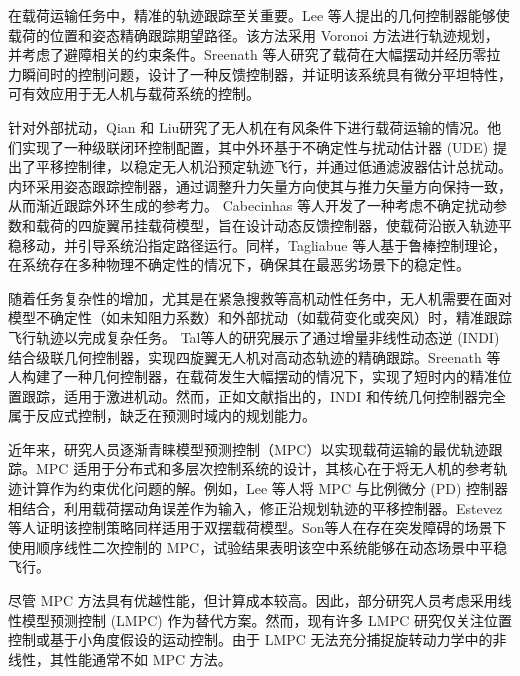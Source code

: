 \documentclass[lang=chs, degree=master, blindreview=false, winfonts=true]{yanputhesis}
\begin{document}
在载荷运输任务中，精准的轨迹跟踪至关重要。Lee 等人\cite{lee2015collision,lee2017geometric}提出的几何控制器能够使载荷的位置和姿态精确跟踪期望路径。该方法采用 Voronoi 方法进行轨迹规划，并考虑了避障相关的约束条件。Sreenath 等人\cite{sreenath2013trajectory}研究了载荷在大幅摆动并经历零拉力瞬间时的控制问题，设计了一种反馈控制器，并证明该系统具有微分平坦特性，可有效应用于无人机与载荷系统的控制。

针对外部扰动，Qian 和 Liu\cite{qian2019path}研究了无人机在有风条件下进行载荷运输的情况。他们实现了一种级联闭环控制配置，其中外环基于不确定性与扰动估计器 (UDE) 提出了平移控制律，以稳定无人机沿预定轨迹飞行，并通过低通滤波器估计总扰动。内环采用姿态跟踪控制器，通过调整升力矢量方向使其与推力矢量方向保持一致，从而渐近跟踪外环生成的参考力。
Cabecinhas 等人\cite{cabecinhas2019trajectory}开发了一种考虑不确定扰动参数和载荷的四旋翼吊挂载荷模型，旨在设计动态反馈控制器，使载荷沿嵌入轨迹平稳移动，并引导系统沿指定路径运行。同样，Tagliabue 等人\cite{2019Robust}基于鲁棒控制理论，在系统存在多种物理不确定性的情况下，确保其在最恶劣场景下的稳定性。

随着任务复杂性的增加，尤其是在紧急搜救等高机动性任务中，无人机需要在面对模型不确定性（如未知阻力系数）和外部扰动（如载荷变化或突风）时，精准跟踪飞行轨迹以完成复杂任务。
Tal等人\cite{2021Accurate}的研究展示了通过增量非线性动态逆 (INDI) 结合级联几何控制器，实现四旋翼无人机对高动态轨迹的精确跟踪。Sreenath 等人\cite{sreenath2013geometric}构建了一种几何控制器，在载荷发生大幅摆动的情况下，实现了短时内的精准位置跟踪，适用于激进机动。然而，正如文献指出的，INDI 和传统几何控制器完全属于反应式控制，缺乏在预测时域内的规划能力。

近年来，研究人员逐渐青睐模型预测控制（MPC）以实现载荷运输的最优轨迹跟踪\cite{urbina2021predictive}。MPC 适用于分布式和多层次控制系统的设计，其核心在于将无人机的参考轨迹计算作为约束优化问题的解。例如，Lee 等人\cite{lee2015study}将 MPC 与比例微分 (PD) 控制器相结合，利用载荷摆动角误差作为输入，修正沿规划轨迹的平移控制器。Estevez 等人\cite{estevez2021hybrid}证明该控制策略同样适用于双摆载荷模型。Son等人\cite{son2018model}在存在突发障碍的场景下使用顺序线性二次控制的 MPC，试验结果表明该空中系统能够在动态场景中平稳飞行。

尽管 MPC 方法具有优越性能，但计算成本较高\cite{norouzi2022deep}。因此，部分研究人员考虑采用线性模型预测控制 (LMPC) 作为替代方案。然而，现有许多 LMPC 研究仅关注位置控制\cite{bangura2014real}或基于小角度假设的运动控制\cite{alexis2014trajectory}。由于 LMPC 无法充分捕捉旋转动力学中的非线性，其性能通常不如 MPC 方法\cite{nguyen2021model}。
\end{document}
